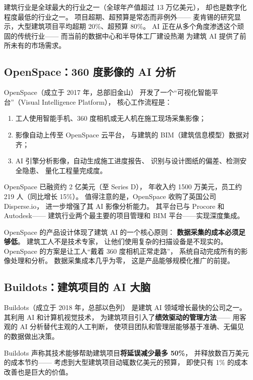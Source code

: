 建筑行业是全球最大的行业之一（全球年产值超过 13 万亿美元），
却也是数字化程度最低的行业之一。
项目超期、超预算是常态而非例外——
麦肯锡的研究显示，大型建筑项目平均超期 20\%、超预算 80\%。
AI 正在从多个角度渗透这个顽固的传统行业——
而当前的数据中心和半导体工厂建设热潮
为建筑 AI 提供了前所未有的市场需求。

\subsection{OpenSpace：360 度影像的 AI 分析}

OpenSpace（成立于 2017 年，总部旧金山）
开发了一个``可视化智能平台''（Visual Intelligence Platform），
核心工作流程是：

\begin{enumerate}[noitemsep]
  \item 工人使用智能手机、360 度相机或无人机在施工现场采集影像；
  \item 影像自动上传至 OpenSpace 云平台，
        与建筑的 BIM（建筑信息模型）数据对齐；
  \item AI 引擎分析影像，自动生成施工进度报告、
        识别与设计图纸的偏差、检测安全隐患、
        量化工程量完成度。
\end{enumerate}

OpenSpace 已融资约 2 亿美元（至 Series D），
年收入约 1500 万美元，员工约 219 人（同比增长 15\%）。
值得注意的是，OpenSpace 收购了英国公司 Disperse.io，
进一步增强了其 AI 影像分析能力。
其平台已与 Procore 和 Autodesk——
建筑行业两个最主要的项目管理和 BIM 平台——实现深度集成。

OpenSpace 的产品设计体现了建筑 AI 的一个核心原则：
\textbf{数据采集的成本必须足够低}。
建筑工人不是技术专家，
让他们使用复杂的扫描设备是不现实的。
OpenSpace 的方案是让工人``戴着 360 度相机正常走路''，
系统自动完成所有的影像处理和分析。
数据采集成本几乎为零，
这是产品能够规模化推广的前提。

\subsection{Buildots：建筑项目的 AI 大脑}

Buildots（成立于 2018 年，总部以色列）
是建筑 AI 领域增长最快的公司之一。
其利用 AI 和计算机视觉技术，
为建筑项目引入了\textbf{绩效驱动的管理方法}——
用客观的 AI 分析替代主观的人工判断，
使项目团队和管理层能够基于准确、无偏见的数据做出决策。

Buildots 声称其技术能够帮助建筑项目\textbf{将延误减少最多 50\%}，
并释放数百万美元的成本节约——
考虑到大型建筑项目动辄数亿美元的预算，
即使只有 1\% 的成本改善也是巨大的价值。

